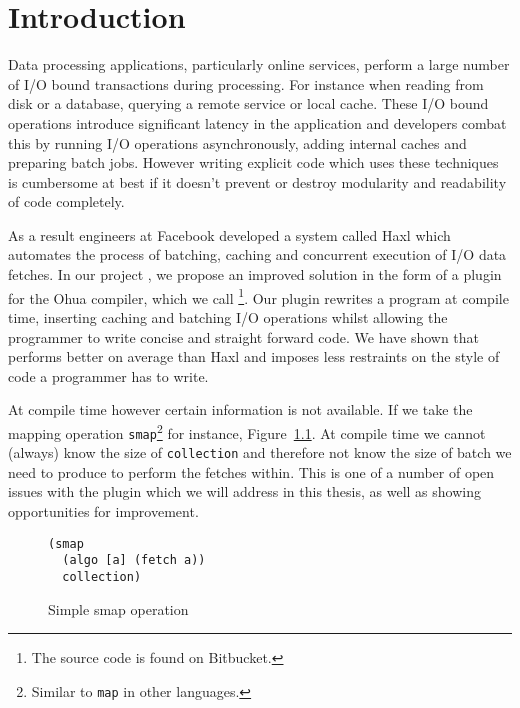 \chapter{Introduction}

\label{ch:Intro}

Data processing applications, particularly online services, perform a large number of I/O bound transactions during processing.
For instance when reading from disk or a database, querying a remote service or local cache.
These I/O bound operations introduce significant latency in the application and developers combat this by running I/O operations asynchronously, adding internal caches and preparing batch jobs.
However writing explicit code which uses these techniques is cumbersome at best if it doesn't prevent or destroy modularity and readability of code completely.

As a result engineers at Facebook developed a system called Haxl\cite{Marlow:2014:NFA:2692915.2628144} which automates the process of batching, caching and concurrent execution of I/O data fetches.
In our project \yauhau{}, we propose an improved solution in the form of a plugin for the Ohua\cite{Ertel:2015:OID:2807426.2807431}\cite{Ohua:library:link} compiler, which we call \yauhau{}\footnote{The source code is found on Bitbucket\cite{Yauhau:repository:link}.}.
Our plugin rewrites a program at compile time, inserting caching and batching I/O operations whilst allowing the programmer to write concise and straight forward code.
We have shown that \yauhau{} performs better on average than Haxl and imposes less restraints on the style of code a programmer has to write.

At compile time however certain information is not available.
If we take the mapping operation \texttt{smap}\footnote{Similar to \texttt{map} in other languages.} for instance, Figure~\ref{fig:simple-smap-operation}.
At compile time we cannot (always) know the size of \texttt{collection} and therefore not know the size of batch we need to produce to perform the fetches within.
This is one of a number of open issues with the \yauhau{} plugin which we will address in this thesis, as well as showing opportunities for improvement.

\begin{figure}[h]
\begin{verbatim}
(smap
  (algo [a] (fetch a))
  collection)
\end{verbatim}
\caption{Simple smap operation}
\label{fig:simple-smap-operation}
\end{figure}

